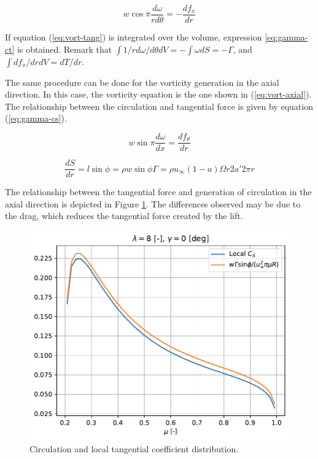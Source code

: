 \begin{equation}
	w \cos \pi \frac{d\omega}{rd\theta} = - \frac{df_x}{dr}
	\label{eq:vort-tang}
\end{equation}

If equation (\ref{eq:vort-tang}) is integrated over the volume, expression \ref{eq:gamma-ct} is obtained. Remark that $ \int 1/r d\omega/d\theta dV = - \int \omega dS = - \Gamma $, and $ \int df_x/dr dV = dT/dr $.

The same procedure can be done for the vorticity generation in the axial direction. In this case, the vorticity equation is the one shown in (\ref{eq:vort-axial}). The relationship between the circulation and tangential force is given by equation (\ref{eq:gamma-cs}).

\begin{equation}
	w \sin \pi \frac{d\omega}{dx} = \frac{df_{\theta}}{dr}
	\label{eq:vort-axial}
\end{equation}

\begin{equation}
	\frac{dS}{dr} = l \sin \phi = \rho w \sin \phi \Gamma = \rho u_{\infty} (1-a) \Omega r 2a' 2 \pi r
	\label{eq:gamma-cs}
\end{equation}

The relationship between the tangential force and generation of circulation in the axial direction is depicted in Figure \ref{img:vort-forces-ax}. The differences observed may be due to the drag, which reduces the tangential force created by the lift.

\begin{figure}[htbp]
	\centering
	\includegraphics[height=0.45\textheight]{./img/circulation/vort-forces-ax.pdf}
	\caption{Circulation and local tangential coefficient distribution.}
	\label{img:vort-forces-ax}
\end{figure}

